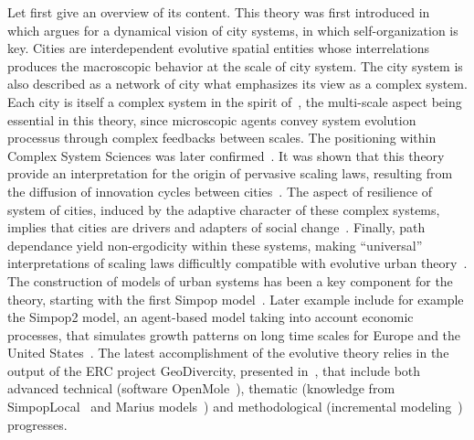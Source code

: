 \documentclass[runningheads,a4paper]{llncs2e/llncs}
\begin{document}
Let first give an overview of its content. This theory was first introduced in~\cite{pumain1997pour} which argues for a dynamical vision of city systems, in which self-organization is key. Cities are interdependent evolutive spatial entities whose interrelations produces the macroscopic behavior at the scale of city system. The city system is also described as a network of city what emphasizes its view as a complex system. Each city is itself a complex system in the spirit of~\cite{berry1964cities}, the multi-scale aspect being essential in this theory, since microscopic agents convey system evolution processus through complex feedbacks between scales. The positioning within Complex System Sciences was later confirmed~\cite{pumain2003approche}. It was shown that this theory provide an interpretation for the origin of pervasive scaling laws, resulting from the diffusion of innovation cycles between cities~\cite{pumain2006evolutionary}. The aspect of resilience of system of cities, induced by the adaptive character of these complex systems, implies that cities are drivers and adapters of social change~\cite{pumain2010theorie}. Finally, path dependance yield non-ergodicity within these systems, making ``universal'' interpretations of scaling laws difficultly compatible with evolutive urban theory~\cite{pumain2012urban}. The construction of models of urban systems has been a key component for the theory, starting with the first Simpop model~\cite{sanders1997simpop}. Later example include for example the Simpop2 model, an agent-based model taking into account economic processes, that simulates growth patterns on long time scales for Europe and the United States~\cite{doi:10.1177/0042098010377366}. The latest accomplishment of the evolutive theory relies in the output of the ERC project GeoDivercity, presented in~\cite{pumain2017urban}, that include both advanced technical (software OpenMole~\cite{reuillon2013openmole}), thematic (knowledge from SimpopLocal~\cite{schmitt2014modelisation} and Marius models~\cite{cottineau2014evolution}) and methodological (incremental modeling~\cite{cottineau2015incremental}) progresses.
\end{document}
